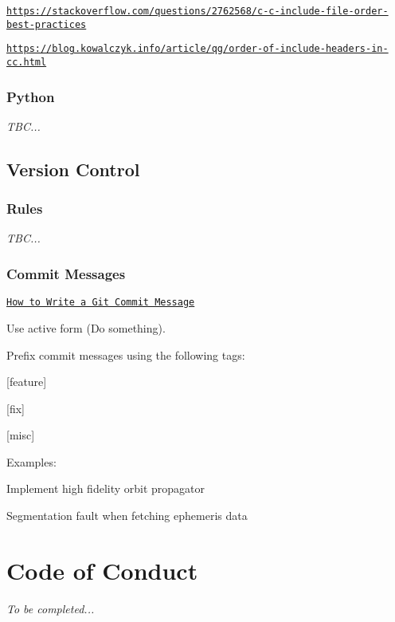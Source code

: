 \begin{DoxyItemize}
\item \href{https://stackoverflow.com/questions/2762568/c-c-include-file-order-best-practices}{\tt https\+://stackoverflow.\+com/questions/2762568/c-\/c-\/include-\/file-\/order-\/best-\/practices}
\item \href{https://blog.kowalczyk.info/article/qg/order-of-include-headers-in-cc.html}{\tt https\+://blog.\+kowalczyk.\+info/article/qg/order-\/of-\/include-\/headers-\/in-\/cc.\+html}
\end{DoxyItemize}\hypertarget{md__c_o_n_t_r_i_b_u_t_i_n_g_Python}{}\subsubsection{Python}\label{md__c_o_n_t_r_i_b_u_t_i_n_g_Python}
{\itshape T\+BC...}\hypertarget{md__c_o_n_t_r_i_b_u_t_i_n_g_Version}{}\subsection{Version Control}\label{md__c_o_n_t_r_i_b_u_t_i_n_g_Version}
\hypertarget{md__c_o_n_t_r_i_b_u_t_i_n_g_Rules}{}\subsubsection{Rules}\label{md__c_o_n_t_r_i_b_u_t_i_n_g_Rules}
{\itshape T\+BC...}\hypertarget{md__c_o_n_t_r_i_b_u_t_i_n_g_Commit}{}\subsubsection{Commit Messages}\label{md__c_o_n_t_r_i_b_u_t_i_n_g_Commit}
\href{https://chris.beams.io/posts/git-commit/}{\tt How to Write a Git Commit Message}

Use active form ({\ttfamily Do something}).

Prefix commit messages using the following tags\+:


\begin{DoxyItemize}
\item \mbox{[}feature\mbox{]}
\item \mbox{[}fix\mbox{]}
\item \mbox{[}misc\mbox{]}
\end{DoxyItemize}

Examples\+:


\begin{DoxyCode}
[feature] Implement high fidelity orbit propagator
\end{DoxyCode}



\begin{DoxyCode}
[fix] Segmentation fault when fetching ephemeris data
\end{DoxyCode}
\hypertarget{md__c_o_n_t_r_i_b_u_t_i_n_g_CodeOfConduct}{}\section{Code of Conduct}\label{md__c_o_n_t_r_i_b_u_t_i_n_g_CodeOfConduct}
{\itshape To be completed...} 
